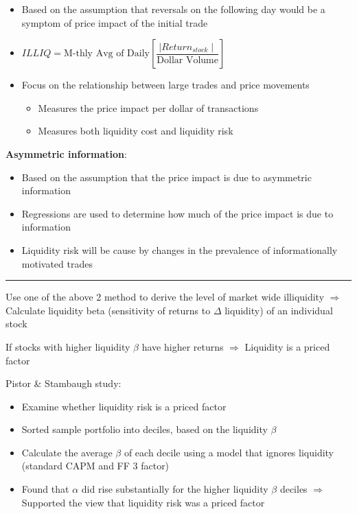 \documentclass[]{book}
\theoremstyle{definition}
\theoremstyle{definition}
\theoremstyle{remark}
\begin{document}
\begin{itemize}
\item
  Based on the assumption that reversals on the following day would be a
  symptom of price impact of the initial trade
\item
  \(ILLIQ = \text{M-thly Avg of Daily}\left[ \dfrac{\mid Return_{stock}\mid}{\text{Dollar Volume}} \right]\)
\item
  Focus on the relationship between large trades and price movements

  \begin{itemize}
  \item
    Measures the price impact per dollar of transactions
  \item
    Measures both liquidity cost and liquidity risk
  \end{itemize}
\end{itemize}

\textbf{Asymmetric information}:

\begin{itemize}
\item
  Based on the assumption that the price impact is due to asymmetric
  information
\item
  Regressions are used to determine how much of the price impact is due
  to information
\item
  Liquidity risk will be cause by changes in the prevalence of
  informationally motivated trades
\end{itemize}

\begin{center}\rule{0.5\linewidth}{\linethickness}\end{center}

Use one of the above 2 method to derive the level of market wide
illiquidity \(\Rightarrow\) Calculate liquidity beta (sensitivity of
returns to \(\Delta\) liquidity) of an individual stock

If stocks with higher liquidity \(\beta\) have higher returns
\(\Rightarrow\) Liquidity is a priced factor

Pistor \& Stambaugh study:

\begin{itemize}
\item
  Examine whether liquidity risk is a priced factor
\item
  Sorted sample portfolio into deciles, based on the liquidity \(\beta\)
\item
  Calculate the average \(\beta\) of each decile using a model that
  ignores liquidity (standard CAPM and FF 3 factor)
\item
  Found that \(\alpha\) did rise substantially for the higher liquidity
  \(\beta\) deciles \(\Rightarrow\) Supported the view that liquidity
  risk was a priced factor
\end{itemize}
\end{document}
